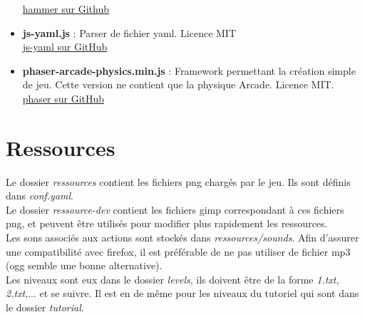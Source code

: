 \documentclass[11pt]{article}
\begin{document}
\begin{itemize}
		\href{https://github.com/EightMedia/hammer.js}
		{hammer sur Github}\\
	\item
		\textbf{js-yaml.js} : Parser de fichier yaml. Licence MIT\\
		\href{https://github.com/nodeca/js-yaml}{js-yaml sur GitHub}\\
	\item
		\textbf{phaser-arcade-physics.min.js} : Framework permettant
		la création simple de jeu. Cette version ne contient que la 
		physique Arcade. Licence MIT.\\
		\href{https://github.com/photonstorm/phaser}
		{phaser sur GitHub}\\
\end{itemize}
\section {Ressources}
Le dossier {\em ressources} contient les fichiers png chargés par le jeu.
Ils sont définis dans {\em conf.yaml}.\\
Le dossier {\em ressource-dev} contient les fichiers gimp correspondant à
ces fichiers png, et peuvent être utilisés pour modifier plus rapidement 
les ressources.\\
Les sons associés aux actions sont stockés dans {\em ressources/sounds}. Afin 
d'assurer une compatibilité avec firefox, il est préférable de ne pas utiliser de fichier mp3 (ogg
semble une bonne alternative).\\
Les niveaux sont eux dans le dossier {\em levels}, ils doivent être de la forme 
{\em 1.txt, 2.txt},... et se suivre. Il est en de même pour les niveaux du 
tutoriel qui sont dans le dossier {\em tutorial}.\\
\end{document}
